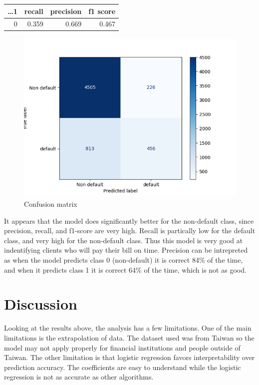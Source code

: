 \documentclass[
]{article}
\begin{document}
\begin{longtable}[]{@{}rrrr@{}}
\toprule
\ldots1 & recall & precision & f1 score \\
\midrule
\endhead
0 & 0.359 & 0.669 & 0.467 \\
\bottomrule
\end{longtable}

\begin{figure}

{\centering \includegraphics[width=0.8\linewidth]{../results/confusion_matrix} 

}

\caption{Confusion matrix}\label{fig:confusion_matrix}
\end{figure}

It appears that the model does significantly better for the non-default
class, since precision, recall, and f1-score are very high. Recall is
partically low for the default class, and very high for the non-default
class. Thus this model is very good at indentifying clients who will pay
their bill on time. Precision can be intrepreted as when the model
predicts class 0 (non-default) it is correct 84\% of the time, and when
it predicts class 1 it is correct 64\% of the time, which is not as
good.

\hypertarget{discussion}{%
\section{Discussion}\label{discussion}}

Looking at the results above, the analysis has a few limitations. One of
the main limitations is the extrapolation of data. The dataset used was
from Taiwan so the model may not apply properly for financial
institutions and people outside of Taiwan. The other limitation is that
logistic regression favors interpretability over prediction accuracy.
The coefficients are easy to understand while the logistic regression is
not as accurate as other algorithms.
\end{document}
